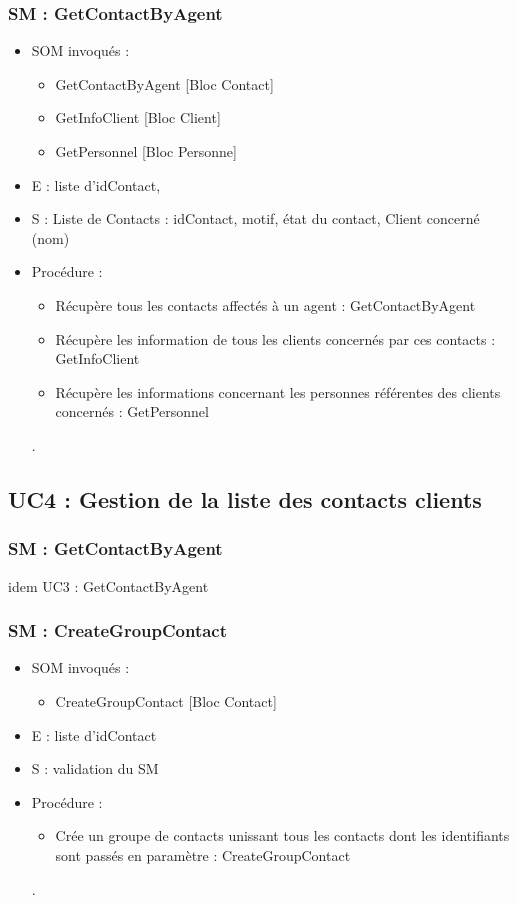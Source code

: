 \subsubsection{SM : GetContactByAgent}
\begin{itemize}
	\item SOM invoqués : 
	\begin{itemize}
		\item GetContactByAgent [Bloc Contact]
		\item GetInfoClient [Bloc Client]
		\item GetPersonnel [Bloc Personne]
	\end{itemize}
	\item E : liste d’idContact, 
	\item S : Liste de Contacts : idContact, motif, état du contact, Client concerné (nom)
	\item Procédure : 
	\begin{itemize}
		\item Récupère tous les contacts affectés à un agent : GetContactByAgent
		\item Récupère les information de tous les clients concernés par ces contacts : GetInfoClient
		\item Récupère les informations concernant les personnes référentes des clients concernés : GetPersonnel
	\end{itemize}.
\end{itemize}



\subsection{UC4 : Gestion de la liste des contacts clients}

\subsubsection{SM : GetContactByAgent}
idem UC3 : GetContactByAgent

\subsubsection{SM : CreateGroupContact}
\begin{itemize}
	\item SOM invoqués : 
	\begin{itemize}
		\item CreateGroupContact [Bloc Contact]
	\end{itemize}
	\item E : liste d’idContact
	\item S : validation du SM
	\item Procédure : 
	\begin{itemize}
		\item Crée un groupe de contacts unissant tous les contacts dont les identifiants sont passés en paramètre : CreateGroupContact
	\end{itemize}.
\end{itemize}

